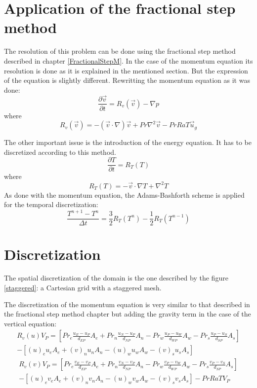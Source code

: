 \section{Application of the fractional step method}
The resolution of this problem can be done using the fractional step method described in chapter \ref{FractionalStepM}. In the case of the momentum equation its resolution is done as it is explained in the mentioned section. But the expression of the equation is slightly different. Rewritting the momentum equation as it was done:
\begin{equation}
\frac{\partial\vec{v}}{\partial t}=R_{v}\left(\vec{v}\right)-\nabla p
\end{equation}
where
\begin{equation}
R_{v}\left(\vec{v}\right)=-\left(\vec{v}\cdot\nabla\right)\vec{v}+Pr\nabla^{2}\vec{v}-PrRaT\vec{u}_{g}
\end{equation}

The other important issue is the introduction of the energy equation. It has to be discretized according to this method.
\begin{equation}
\frac{\partial T}{\partial t}=R_{T}\left(T\right)
\end{equation}
where
\begin{equation}
R_{T}\left(T\right)=-\vec{v}\cdot\nabla T+\nabla^{2}T
\end{equation}
As done with the momentum equation, the Adams-Bashforth scheme is applied for the temporal discretization:
\begin{equation}
\frac{T^{n+1}-T^{n}}{\Delta t}=\frac{3}{2}R_{T}\left(T^{n}\right)-\frac{1}{2}R_{T}\left(T^{n-1}\right)
\end{equation}

\section{Discretization}
The spatial discretization of the domain is the one described by the figure \ref{staggered}: a Cartesian grid with a staggered mesh.

The discretization of the momentum equation is very similar to that described in the fractional step method chapter but adding the gravity term in the case of the vertical equation:
\begin{multline}
	R_{v}\left(u\right)V_{P}=\left[Pr_{e}\frac{u_{E}-u_{P}}{d_{EP}}A_{e}+Pr_{n}\frac{u_{N}-u_{P}}{d_{NP}}A_{n}-Pr_{w}\frac{u_{P}-u_{W}}{d_{WP}}A_{w}-Pr_{s}\frac{u_{P}-u_{S}}{d_{SP}}A_{s}\right] \\
	-\left[\left(u\right)_{e}u_{e}A_{e}+\left(v\right)_{n}u_{n}A_{n}-\left(u\right)_{w}u_{w}A_{w}-\left(v\right)_{s}u_{s}A_{s}\right]
\end{multline}
\begin{multline}
	R_{v}\left(v\right)V_{P}=\left[Pr_{e}\frac{v_{E}-v_{P}}{d_{EP}}A_{e}+Pr_{n}\frac{v_{N}-v_{P}}{d_{NP}}A_{n}-Pr_{w}\frac{v_{P}-v_{W}}{d_{WP}}A_{w}-Pr_{s}\frac{v_{P}-v_{S}}{d_{SP}}A_{s}\right] \\
	-\left[\left(u\right)_{e}v_{e}A_{e}+\left(v\right)_{n}v_{n}A_{n}-\left(u\right)_{w}v_{w}A_{w}-\left(v\right)_{s}v_{s}A_{s}\right]-PrRaTV_{P}
\end{multline}

